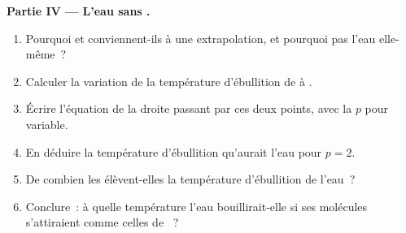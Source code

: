 \begin{problem}
\medskip
\noindent\textbf{Partie IV --- L'eau sans .}
\begin{enumerate}[resume]
  \item Pourquoi  et  conviennent-ils à une
        extrapolation, et pourquoi pas l'eau elle-même~?
  \item Calculer la variation de la température d'ébullition de 
        à .
  \item Écrire l'équation de la droite passant par ces deux points, avec
        la  $p$ pour variable.
  \item En déduire la température d'ébullition qu'aurait l'eau pour
        $p = 2$.
  \item De combien les  élèvent-elles la température
        d'ébullition de l'eau~?
  \item Conclure~: à quelle température l'eau bouillirait-elle si ses
        molécules s'attiraient comme celles de ~?
\end{enumerate}
\end{problem}
